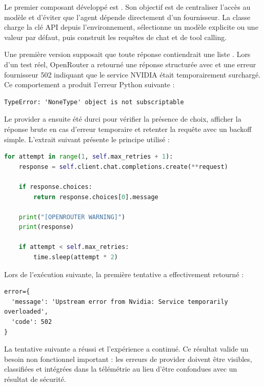 Le premier composant développé est . Son objectif est de centraliser l'accès au modèle et d'éviter que l'agent dépende directement d'un fournisseur. La classe charge la clé API depuis l'environnement, sélectionne un modèle explicite ou une valeur par défaut, puis construit les requêtes de chat et de tool calling.

Une première version supposait que toute réponse contiendrait une liste . Lors d'un test réel, OpenRouter a retourné une réponse structurée avec  et une erreur fournisseur 502 indiquant que le service NVIDIA était temporairement surchargé. Ce comportement a produit l'erreur Python suivante :

\begin{lstlisting}[caption={Erreur observée avant durcissement du provider}]
TypeError: 'NoneType' object is not subscriptable
\end{lstlisting}

Le provider a ensuite été durci pour vérifier la présence de choix, afficher la réponse brute en cas d'erreur temporaire et retenter la requête avec un backoff simple. L'extrait suivant présente le principe utilisé :

\begin{lstlisting}[language=Python,caption={Gestion simplifiée des réponses temporaires du provider}]
for attempt in range(1, self.max_retries + 1):
    response = self.client.chat.completions.create(**request)

    if response.choices:
        return response.choices[0].message

    print("[OPENROUTER WARNING]")
    print(response)

    if attempt < self.max_retries:
        time.sleep(attempt * 2)
\end{lstlisting}

Lors de l'exécution suivante, la première tentative a effectivement retourné :

\begin{lstlisting}[caption={Erreur fournisseur réellement observée}]
error={
  'message': 'Upstream error from Nvidia: Service temporarily overloaded',
  'code': 502
}
\end{lstlisting}

La tentative suivante a réussi et l'expérience a continué. Ce résultat valide un besoin non fonctionnel important : les erreurs de provider doivent être visibles, classifiées et intégrées dans la télémétrie au lieu d'être confondues avec un résultat de sécurité.


